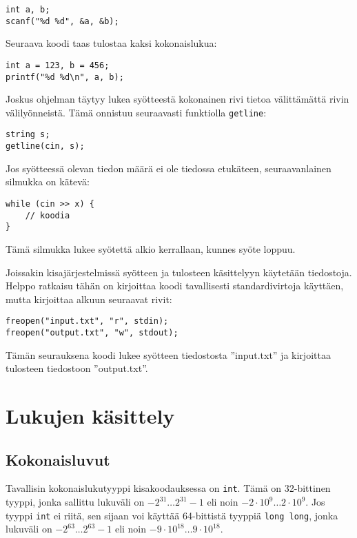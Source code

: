 \begin{lstlisting}
int a, b;
scanf("%d %d", &a, &b);
\end{lstlisting}
Seuraava koodi taas tulostaa kaksi kokonaislukua:

\begin{lstlisting}
int a = 123, b = 456;
printf("%d %d\n", a, b);
\end{lstlisting}

Joskus ohjelman täytyy lukea syötteestä
kokonainen rivi tietoa
välittämättä rivin välilyönneistä.
Tämä onnistuu seuraavasti funktiolla
\texttt{getline}:

\begin{lstlisting}
string s;
getline(cin, s);
\end{lstlisting}

Jos syötteessä olevan tiedon määrä ei ole tiedossa
etukäteen, seuraavanlainen silmukka on kätevä:

\begin{lstlisting}
while (cin >> x) {
    // koodia
}
\end{lstlisting}

Tämä silmukka lukee syötettä alkio
kerrallaan, kunnes syöte loppuu.

Joissakin kisajärjestelmissä syötteen ja tulosteen
käsittelyyn käytetään tiedostoja. Helppo ratkaisu tähän
on kirjoittaa koodi tavallisesti
standardivirtoja käyttäen,
mutta kirjoittaa alkuun seuraavat rivit:

\begin{lstlisting}
freopen("input.txt", "r", stdin);
freopen("output.txt", "w", stdout);
\end{lstlisting}
Tämän seurauksena koodi lukee syötteen tiedostosta
''input.txt'' ja kirjoittaa tulosteen
tiedostoon ''output.txt''.

\section{Lukujen käsittely}

\subsection{Kokonaisluvut}


Tavallisin kokonaislukutyyppi kisakoodauksessa on \texttt{int}.
Tämä on 32-bittinen tyyppi,
jonka sallittu lukuväli on $-2^{31} \ldots 2^{31}-1$
eli noin $-2 \cdot 10^9 \ldots 2 \cdot 10^9$.
Jos tyyppi \texttt{int} ei riitä, sen sijaan voi käyttää
64-bittistä tyyppiä
\texttt{long long}, jonka lukuväli on $-2^{63} \ldots 2^{63}-1$
eli noin $-9 \cdot 10^{18} \ldots 9 \cdot 10^{18}$.

